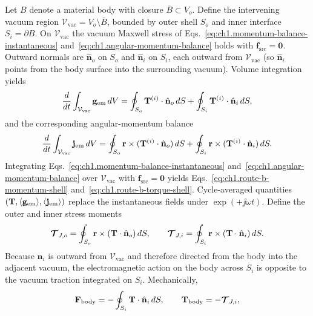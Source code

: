 Let $B$ denote a material body with closure $\overline{B}\subset V_o$. Define the intervening vacuum region $\mathcal{V}_{\mathrm{vac}}=V_o\setminus\overline{B}$, bounded by outer shell $S_o$ and inner interface $S_i=\partial B$. On $\mathcal{V}_{\mathrm{vac}}$ the vacuum Maxwell stress of Eqs.~\eqref{eq:ch1.momentum-balance-instantaneous} and~\eqref{eq:ch1.angular-momentum-balance} holds with $\mathbf{f}_{\mathrm{src}}=\mathbf{0}$. Outward normals are $\hat{\mathbf{n}}_o$ on $S_o$ and $\hat{\mathbf{n}}_i$ on $S_i$, each outward from $\mathcal{V}_{\mathrm{vac}}$ (so $\hat{\mathbf{n}}_i$ points from the body surface into the surrounding vacuum). Volume integration yields
\begin{equation}
\label{eq:ch1.route-b-momentum-shell}
\frac{d}{dt}\int_{\mathcal{V}_{\mathrm{vac}}}\mathbf{g}_{\mathrm{em}}\,dV
=\oint_{S_o}\mathbf{T}^{(i)}\cdot\hat{\mathbf{n}}_o\,dS
+\oint_{S_i}\mathbf{T}^{(i)}\cdot\hat{\mathbf{n}}_i\,dS,
\end{equation}
and the corresponding angular-momentum balance
\begin{equation}
\label{eq:ch1.route-b-torque-shell}
\frac{d}{dt}\int_{\mathcal{V}_{\mathrm{vac}}}\mathbf{j}_{\mathrm{em}}\,dV
=\oint_{S_o}\mathbf{r}\times(\mathbf{T}^{(i)}\cdot\hat{\mathbf{n}}_o)\,dS
+\oint_{S_i}\mathbf{r}\times(\mathbf{T}^{(i)}\cdot\hat{\mathbf{n}}_i)\,dS.
\end{equation}
Integrating Eqs.~\eqref{eq:ch1.momentum-balance-instantaneous} and~\eqref{eq:ch1.angular-momentum-balance} over $\mathcal{V}_{\mathrm{vac}}$ with $\mathbf{f}_{\mathrm{src}}=\mathbf{0}$ yields Eqs.~\eqref{eq:ch1.route-b-momentum-shell} and~\eqref{eq:ch1.route-b-torque-shell}. Cycle-averaged quantities $(\mathbf{T},\langle\mathbf{g}_{\mathrm{em}}\rangle,\langle\mathbf{j}_{\mathrm{em}}\rangle)$ replace the instantaneous fields under $\exp(+\jj\omega t)$. Define the outer and inner stress moments
\[
\boldsymbol{\mathcal{T}}_{J,o}=\oint_{S_o}\mathbf{r}\times(\mathbf{T}\cdot\hat{\mathbf{n}}_o)\,dS,\qquad
\boldsymbol{\mathcal{T}}_{J,i}=\oint_{S_i}\mathbf{r}\times(\mathbf{T}\cdot\hat{\mathbf{n}}_i)\,dS.
\]
Because $\hat{\mathbf{n}}_i$ is outward from $\mathcal{V}_{\mathrm{vac}}$ and therefore directed from the body into the adjacent vacuum, the electromagnetic action on the body across $S_i$ is opposite to the vacuum traction integrated on $S_i$. Mechanically,
\begin{equation}
\label{eq:ch1.route-b-body-force}
\mathbf{F}_{\mathrm{body}}=-\oint_{S_i}\mathbf{T}\cdot\hat{\mathbf{n}}_i\,dS,
\qquad
\mathbf{T}_{\mathrm{body}}=-\boldsymbol{\mathcal{T}}_{J,i},
\end{equation}
